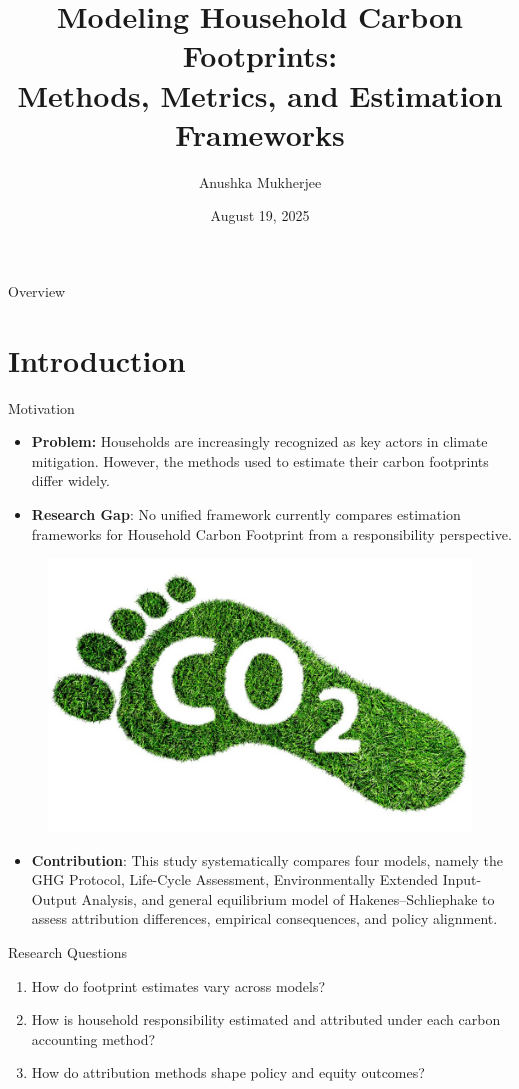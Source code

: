 \documentclass{beamer}
\title[Modeling Household Carbon Footprints]{Modeling Household Carbon Footprints:\\ Methods, Metrics, and Estimation Frameworks}
\author[Anushka Mukherjee]{Anushka Mukherjee}
\institute[University of Bonn]{University of Bonn}
\date[July 2025]{August 19, 2025}
\begin{document}
\begin{frame}
  \titlepage
\end{frame}

\begin{frame}{Overview}
  \tableofcontents
\end{frame}

\section{Introduction}
\begin{frame}{Motivation}
\vspace{-2.0em}
\footnotesize
\begin{itemize}
    \item {\textbf{Problem: }}Households are increasingly recognized as key actors in climate mitigation. However, the methods used to estimate their carbon footprints differ widely.
    \item \textbf{Research Gap}: No unified framework currently compares estimation frameworks for Household Carbon Footprint from a responsibility perspective.
\end{itemize}

\begin{figure}
\centering
    \includegraphics[width=0.3\linewidth]{co2.jpg}
\end{figure}


\begin{itemize}
\item \textbf{Contribution}: This study systematically compares four models, namely the GHG Protocol, Life-Cycle Assessment, Environmentally Extended Input-Output Analysis, and general equilibrium model of Hakenes–Schliephake to assess attribution differences, empirical consequences, and policy alignment.
\end{itemize}
\end{frame}



\begin{frame}{Research Questions}
\begin{enumerate}
  \item How do footprint estimates vary across models?
  \item How is household responsibility estimated and attributed under each carbon accounting method?
  \item How do attribution methods shape policy and equity outcomes?
\end{enumerate}
\end{frame}
\end{document}
